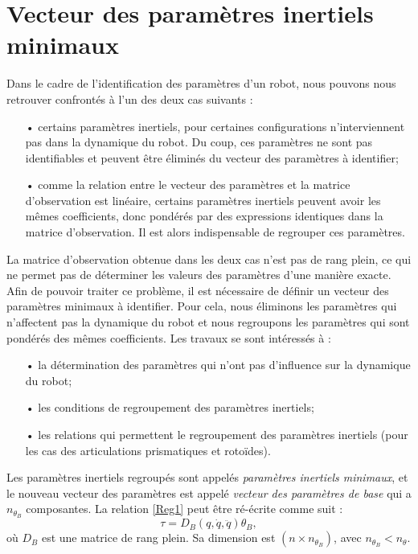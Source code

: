 \documentclass[12pt,a4paper,twoside]{report}
\begin{document}
\section{Vecteur des paramètres inertiels minimaux}
\label{param_minim}
Dans le cadre de l'identification des paramètres d'un robot, nous pouvons nous retrouver confrontés à l'un des deux cas suivants :
\begin{itemize}
\item[•] certains paramètres inertiels, pour certaines configurations n'interviennent pas dans la dynamique du robot. Du coup, ces paramètres ne sont pas identifiables et peuvent être éliminés du vecteur des paramètres à identifier;
\item[•] comme la relation entre le vecteur des paramètres et la matrice d'observation est linéaire, certains paramètres inertiels peuvent avoir les mêmes coefficients, donc pondérés par des expressions identiques dans la matrice d'observation. Il est alors indispensable de regrouper ces paramètres.
\end{itemize}
La matrice d'observation obtenue dans les deux cas n'est pas de rang plein, ce qui ne permet pas de déterminer les valeurs des paramètres d'une manière exacte.
Afin de pouvoir traiter ce problème, il est nécessaire de définir un vecteur des paramètres minimaux à identifier. Pour cela, nous éliminons les paramètres qui n'affectent pas la dynamique du robot et nous regroupons les paramètres qui sont pondérés des m\^emes coefficients. Les travaux se sont intéressés à :
\begin{itemize}
\item[•] la détermination des paramètres qui n'ont pas d'influence sur la dynamique du robot;
\item[•] les conditions de regroupement des paramètres inertiels;
\item[•] les relations qui permettent le regroupement des paramètres inertiels (pour les cas des articulations prismatiques et rotoïdes).
\end{itemize}
Les paramètres inertiels regroupés sont appelés \textit{paramètres inertiels minimaux}, et le nouveau vecteur des paramètres est appelé \textit{vecteur des paramètres de base} qui a $n_{\theta_B}$ composantes. La relation \eqref{Reg1} peut être ré-écrite comme suit :
\begin{equation}
\tau = D_B(q,\dot{q},\ddot{q}) \theta_B,
\label{Reg3}
\end{equation}
où $D_B$ est une matrice de rang plein. Sa dimension est $(n\times n_{\theta_B})$, avec $n_{\theta_B}<n_{\theta}$.
\end{document}
